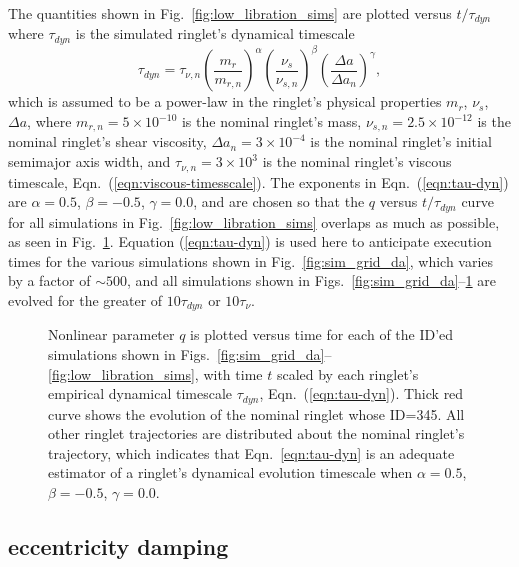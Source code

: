 \documentclass[preprint]{aastex62}
\begin{document}
The quantities shown in Fig.\ \ref{fig:low_libration_sims} are plotted versus 
$t/\tau_{dyn}$ where $\tau_{dyn}$ is the simulated ringlet's
dynamical timescale
\begin{equation}
    \label{eqn:tau-dyn}
    \tau_{dyn} = \tau_{\nu, n}\left(\frac{m_r}{m_{r,n}}\right)^\alpha
        \left(\frac{\nu_s}{\nu_{s,n}}\right)^\beta 
        \left(\frac{\Delta a}{\Delta a_{n}}\right)^\gamma,
\end{equation}
which is assumed to be a power-law in the ringlet's physical properties
$m_r$, $\nu_s$, $\Delta a$, where 
$m_{r,n}=5\times10^{-10}$ is the nominal ringlet's mass, 
$\nu_{s,n}=2.5\times10^{-12}$ is the nominal ringlet's shear viscosity, 
$\Delta a_{n}=3\times10^{-4}$ is the nominal ringlet's initial semimajor axis width,
and $\tau_{\nu, n} = 3\times10^3$ is the nominal ringlet's viscous timescale, 
Eqn.\ (\ref{eqn:viscous-timesscale}).
The exponents in Eqn.\ (\ref{eqn:tau-dyn}) are $\alpha=0.5$, $\beta=-0.5$, $\gamma=0.0$,
and are chosen so that the $q$ versus $t/\tau_{dyn}$ curve for all simulations
in Fig.\ \ref{fig:low_libration_sims} overlaps as much as possible, as
seen in Fig.\ \ref{fig:q_vs_ID}. Equation (\ref{eqn:tau-dyn}) is used here to anticipate
execution times for the various simulations shown in Fig.\ \ref{fig:sim_grid_da}, 
which varies by a factor of $\sim500$, and all simulations shown in 
Figs.\ \ref{fig:sim_grid_da}--\ref{fig:q_vs_ID} are evolved for the greater of $10\tau_{dyn}$ or $10\tau_\nu$.
\begin{figure}
    \caption{
        \label{fig:q_vs_ID}
        Nonlinear parameter $q$ is plotted versus time for each of the ID'ed
        simulations shown in Figs.\ \ref{fig:sim_grid_da}--\ref{fig:low_libration_sims},
        with time $t$ scaled by each ringlet's empirical dynamical timescale $\tau_{dyn}$,
        Eqn.\ (\ref{eqn:tau-dyn}). Thick red curve shows the evolution of the
        nominal ringlet whose ID=345. All other ringlet trajectories are distributed
        about the nominal ringlet's trajectory, which indicates that Eqn.\ \ref{eqn:tau-dyn} 
        is an adequate estimator of a ringlet's dynamical evolution timescale
        when $\alpha=0.5$, $\beta=-0.5$, $\gamma=0.0$.
    }
\end{figure}

\subsection{eccentricity damping}
\label{subsec:eccentricity}
\end{document}
